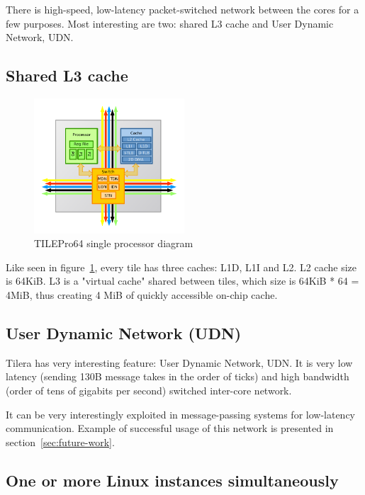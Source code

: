 \documentclass[english,11pt]{l4proj}
\begin{document}
There is high-speed, low-latency packet-switched network between the cores for a
few purposes. Most interesting are two: shared L3 cache and User Dynamic
Network, UDN.

\subsection{Shared L3 cache}

\begin{figure}
    \centering
    \includegraphics[width=0.5\textwidth]{images/tile64_cpu.pdf}
    \caption{TILEPro64 single processor diagram}
    \label{fig:tile64_cpu}
\end{figure}

Like seen in figure~\ref{fig:tile64_cpu}, every tile has three caches: L1D, L1I
and L2. L2 cache size is 64KiB. L3 is a "virtual cache" shared between tiles,
which size is 64KiB * 64 = 4MiB, thus creating 4 MiB of quickly accessible
on-chip cache.

\subsection{User Dynamic Network (UDN)}

Tilera has very interesting feature: User Dynamic Network, UDN. It is very low
latency (sending 130B message takes in the order of ticks) and high bandwidth
(order of tens of gigabits per second) switched inter-core network.

It can be very interestingly exploited in message-passing systems for
low-latency communication. Example of successful usage of this network is
presented in section~\ref{sec:future-work}.

\subsection{One or more Linux instances simultaneously}
\end{document}
